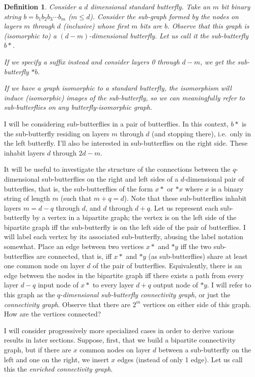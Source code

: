 \documentclass[12pt]{article}
\newtheorem{definition}{Definition}
\begin{document}
\begin{definition}
Consider a $d$ dimensional standard butterfly.  Take an $m$ bit
binary string $b=b_{1}b_{2}b_{3}\cdots b_{m}$  ($m\leq d$).
Consider the sub-graph formed by the nodes on layers $m$ through $d$
(inclusive) whose first $m$ bits are $b$.  Observe that this graph
is (isomorphic to) a $(d-m)$-dimensional butterfly.  Let us call it 
the \emph{sub-butterfly $b*$}.

If we specify a suffix instead and consider layers 0 through $d-m$,
we get the \emph{sub-butterfly $*b$}.

If we have a graph isomorphic to a standard butterfly, the isomorphism
will induce (isomorphic) images of the sub-butterfly, so we can
meaningfully refer to sub-butterflies on any butterfly-isomorphic graph.
\end{definition}
I will be considering sub-butterflies in a pair of butterflies.  In
this context, $b*$ is the sub-butterfly residing on layers $m$
through $d$ (and stopping there), i.e.\ only in the left butterfly.
I'll also be interested in sub-butterflies on the right side.  
These inhabit layers $d$ through $2d-m$.

It will be useful to investigate the structure of the connections between
the $q$-dimensional sub-butterflies on the right and left sides of
a $d$-dimensional pair of butterflies, that is, the sub-butterflies of the
 form $x*$ or $*x$ where $x$ is a binary string of length $m$ (such that
$m+q=d$).  Note that these sub-butterflies inhabit layers $m=d-q$ through
 $d$, and $d$ through $d+q$.  Let us represent each 
sub-butterfly by a vertex in a bipartite graph; the vertex is on the left
side of the bipartite graph iff the sub-butterfly is on the left
side of the pair of butterflies.  I will label each vertex by its associated
sub-butterfly, abusing the label notation somewhat.  
Place an edge between two vertices $x*$ and $*y$ iff
the two sub-butterflies are connected, that is, iff $x*$ and $*y$
(as sub-butterflies) share at least
one common node on layer $d$ of the pair of butterflies.
Equivalently, there is an edge between the nodes in the bipartite graph
iff there exists a path from every layer $d-q$ input node 
of $x*$ to every layer $d+q$ output node of $*y$. 
I will refer to this graph as the \emph{$q$-dimensional 
sub-butterfly connectivity graph},
or just the \emph{connectivity graph}.
Observe that there are $2^{m}$ vertices
on either side of this graph.  How are the vertices connected?

I will consider progressively more specialized cases in order to derive 
various results in later sections.  Suppose, first, that we build a bipartite
connectivity graph, but if there are $x$ common nodes on layer $d$ 
between a sub-butterfly on the left and one on the right, 
we insert $x$ edges (instead of only 1 edge).  Let us call this the 
\emph{enriched connectivity graph}.  
\end{document}
